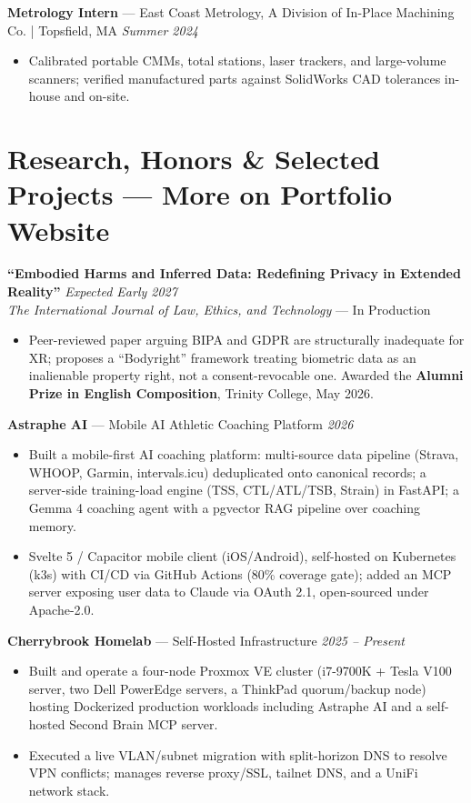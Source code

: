 \documentclass[10pt, letterpaper]{article}
\begin{document}
\vspace{1pt}\noindent
\textbf{Metrology Intern} --- East Coast Metrology, A Division of In-Place Machining Co. | Topsfield, MA
\hfill \textit{Summer 2024}
\begin{itemize}
  \item Calibrated portable CMMs, total stations, laser trackers, and large-volume scanners;
    verified manufactured parts against SolidWorks CAD tolerances in-house and on-site.
\end{itemize}

\section{Research, Honors \& Selected Projects --- More on Portfolio Website}

\noindent
\textbf{``Embodied Harms and Inferred Data: Redefining Privacy in Extended Reality''}
\hfill \textit{Expected Early 2027}\\
\textit{The International Journal of Law, Ethics, and Technology} --- In Production
\begin{itemize}
  \item Peer-reviewed paper arguing BIPA and GDPR are structurally inadequate for XR;
    proposes a ``Bodyright'' framework treating biometric data as an inalienable property
    right, not a consent-revocable one. Awarded the \textbf{Alumni Prize in English
    Composition}, Trinity College, May 2026.
\end{itemize}

\vspace{1pt}\noindent
\textbf{Astraphe AI} --- Mobile AI Athletic Coaching Platform
\hfill \textit{2026}
\begin{itemize}
  \item Built a mobile-first AI coaching platform: multi-source data pipeline (Strava,
    WHOOP, Garmin, intervals.icu) deduplicated onto canonical records; a server-side
    training-load engine (TSS, CTL/ATL/TSB, Strain) in FastAPI; a Gemma 4 coaching
    agent with a pgvector RAG pipeline over coaching memory.
  \item Svelte 5 / Capacitor mobile client (iOS/Android), self-hosted on Kubernetes (k3s)
    with CI/CD via GitHub Actions (80\% coverage gate); added an MCP server exposing user
    data to Claude via OAuth 2.1, open-sourced under Apache-2.0.
\end{itemize}

\vspace{1pt}\noindent
\textbf{Cherrybrook Homelab} --- Self-Hosted Infrastructure
\hfill \textit{2025 -- Present}
\begin{itemize}
  \item Built and operate a four-node Proxmox VE cluster (i7-9700K + Tesla V100 server, two
    Dell PowerEdge servers, a ThinkPad quorum/backup node) hosting Dockerized production
    workloads including Astraphe AI and a self-hosted Second Brain MCP server.
  \item Executed a live VLAN/subnet migration with split-horizon DNS to resolve VPN
    conflicts; manages reverse proxy/SSL, tailnet DNS, and a UniFi network stack.
\end{itemize}
\end{document}
